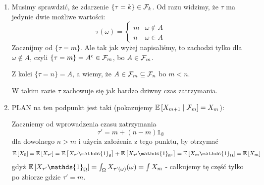 \begin{solution}$ $

  \begin{enumerate}[label=(\alph*)]
    \item Musimy sprawdzić, że zdarzenie $\{\tau=k\}\in\mathcal{F}_k$. Od razu widzimy, że $\tau$ ma jedynie dwie możliwe wartości:
      $$\tau(\omega)=\begin{cases}m & \omega\not\in A\\n & \omega\in A\end{cases}$$
      Zacznijmy od $\{\tau =m\}$. Ale tak jak wyżej napisaliśmy, to zachodzi tylko dla $\omega\not\in A$, czyli $\{\tau=m\}=A^c\in\mathcal{F}_m$, bo $A\in\mathcal{F}_m$.

      Z kolei $\{\tau=n\}=A$, a wiemy, że $A\in\mathcal{F}_m\subseteq\mathcal{F}_n$ bo $m<n$.

      W takim razie $\tau$ zachowuje się jak bardzo dziwny czas zatrzymania.
    \item PLAN na ten podpunkt jest taki (pokazujemy $\expected{X_{m+1}}{\set{F}_m}=X_m$):
      \begin{center}
      \end{center}

      Zaczniemy od wprowadzenia czasu zatrzymania
      $$\tau'=m+(n-m)\mathds{1}_\emptyset$$
      dla dowolnego $n>m$ i użycia założenia z tego punktu, by otrzymać
      $$\expected{X_0}=\expected{X_{\tau'}}=\expected{X_{\tau'}\mathds{1}_\emptyset}+\expected{X_{\tau'}\mathds{1}_{\emptyset^c}}=\expected{X_m\mathds{1}_\Omega}=\expected{X_m}$$
      gdyż $\expected{X_{\tau'}\mathds{1}_\Omega}=\int_\Omega X_{\tau'(\omega)}(\omega)=\int X_m$ - całkujemy tę część tylko po zbiorze gdzie $\tau'=m$.


\end{enumerate}
\end{solution}
